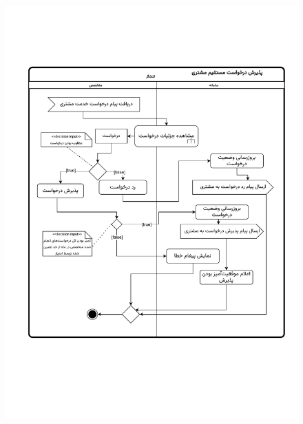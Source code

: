 \begin{figure}[ht!]
	\centering
	\includegraphics[scale=0.8, page=1]{figs/OOD-activity-directaccept.pdf}
\end{figure}
\FloatBarrier
\newpage

